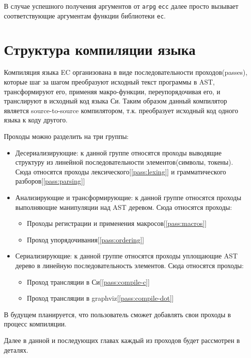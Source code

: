 В случае успешного получения аргументов от \verb|arpg| \verb|ecc| далее просто вызывает соответствующие аргументам функции библиотеки \verb|ec|.


\section{Структура компиляции языка}
\label{passes}

Компиляция языка EC организована в виде последовательности проходов(passes), которые шаг за шагом преобразуют исходный текст программы в AST, 
трансформируют его, применяя макро-функции, переупорядочивая его, и транслируют в исходный код языка Си. 
Таким образом данный компилятор является source-to-source компилятором, т.к. преобразует исходный код одного языка к коду другого.

Проходы можно разделить на три группы:
\begin{itemize}
    \item Десериализирующие: к данной группе относятся проходы выводящие структуру из линейной последовательности элементов(символы, токены). 
    Сюда относятся проходы лексического[\ref{pass:lexing}] и грамматического разборов[\ref{pass:parsing}]
    \item Анализирующие и трансформирующие: к данной группе относятся проходы выполняющие манипуляции над AST деревом. 
    Сюда относятся проходы:
    \begin{itemize}
        \item Проходы регистрации и применения макросов[\ref{pass:macros}]
        \item Проход упорядочивания[\ref{pass:ordering}]
    \end{itemize}
    \item Сериализирующие: к данной группе относятся проходы уплощающие AST дерево в линейную последовательность элементов.
    Сюда относятся проходы:
    \begin{itemize}
        \item Проход трансляции в Си[\ref{pass:compile-c}]
        \item Проход трансляции в graphviz[\ref{pass:compile-dot}]
    \end{itemize}
\end{itemize}

В будущем планируется, что пользователь сможет добавлять свои проходы в процесс компиляции.

Далее в данной и последующих главах каждый из проходов будет рассмотрен в деталях.

